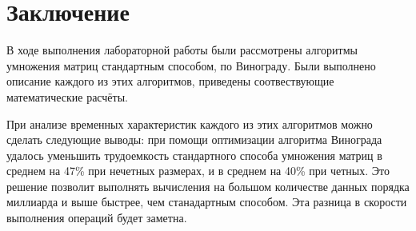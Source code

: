 \chapter*{Заключение}
В ходе выполнения лабораторной работы были рассмотрены алгоритмы умножения матриц стандартным способом, по Винограду. Были выполнено описание каждого из этих алгоритмов, приведены соотвествующие математические расчёты.

При анализе временных характеристик каждого из этих алгоритмов можно сделать следующие выводы: при помощи оптимизации алгоритма Винограда удалось уменьшить трудоемкость стандартного способа умножения матриц в среднем на 47\% при нечетных размерах, и в среднем на 40\% при четных. Это решение позволит выполнять вычисления на большом количестве данных порядка миллиарда и выше быстрее, чем станадартным способом. Эта разница в скорости выполнения операций будет заметна.
  